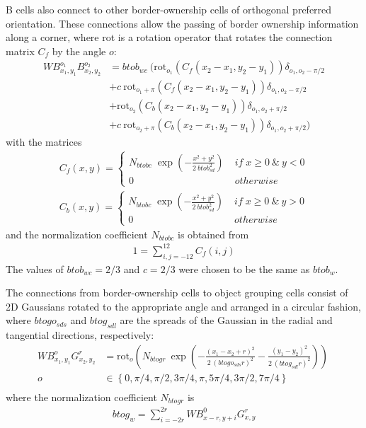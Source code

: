 B cells also connect to other border-ownership cells of orthogonal preferred
orientation. These connections allow the passing of border ownership
information along a corner, where rot is a rotation operator that rotates the connection matrix $C_f$ by the angle $o$:
\begin{align}
	WB^{o_1}_{x_1,y_1}B^{o_2}_{x_2,y_2}&=btob_{wc}\: (\text{rot}_{o_1}(C_f(x_2-x_1,y_2-y_1)) \delta_{o_1,o_2-\pi/2} \\\nonumber
	&+c\:\text{rot}_{o_1+\pi}(C_f(x_2-x_1,y_2-y_1)) \delta_{o_1,o_2-\pi/2} \\\nonumber
	&+\text{rot}_{o_2}(C_b(x_2-x_1,y_2-y_1)) \delta_{o_1,o_2+\pi/2} \\\nonumber
	&+c\:\text{rot}_{o_2+\pi}(C_b(x_2-x_1,y_2-y_1)) \delta_{o_1,o_2+\pi/2} )
\end{align}
with the matrices
\begin{align}
	C_f(x,y)=
	\begin{cases}
	N_{btobc}\;\exp(-\frac{x^2+y^2}{2\:btob_{sd}^2})\;&if\;x\geq0\:\&\:y<0\\
	0\;&otherwise
	\end{cases}\\
	C_b(x,y)=
	\begin{cases}
	N_{btobc}\;\exp(-\frac{x^2+y^2}{2\:btob_{sd}^2})\;&if\;x\geq0\:\&\:y>0\\
	0\;&otherwise
	\end{cases}
\end{align}
and the normalization coefficient $N_{btobc}$ is obtained from
\begin{align}
1=\sum^{12}_{i,j=-12} C_f(i,j)
\end{align}
The values of $btob_{wc}=2/3$ and $c=2/3$ were chosen to be the same as $btob_w$.

The connections from border-ownership cells to object grouping cells consist of 2D Gaussians rotated to the appropriate angle and arranged in a circular fashion, 
where $btogo_{sds}$ and $btog_{sdl}$ are the spreads of the Gaussian in the radial and tangential directions, respectively:
\begin{align}
	WB^{o}_{x_1,y_1}G^{r}_{x_2,y_2}&=\text{rot}_{o}\left(N_{btogr}\: \exp\left(-\frac{(x_1-x_2+r)^2}{2\: (btogo_{sds} r)^2}
	-\frac{(y_1-y_2)^2}{2\: (btog_{sdl} r)^2}\right)\right)\  \nonumber\\  
	o&\in \left\{0,\pi/4,\pi/2,3\pi/4,\pi,5\pi/4,3\pi/2,7\pi/4\right\} \nonumber\\
\end{align}
where the normalization coefficient $N_{btogr}$ is
\begin{align}
	btog_w=\sum^{2r}_{i=-2r} WB^{0}_{x-r,y+i}G^{r}_{x,y}
\end{align}

